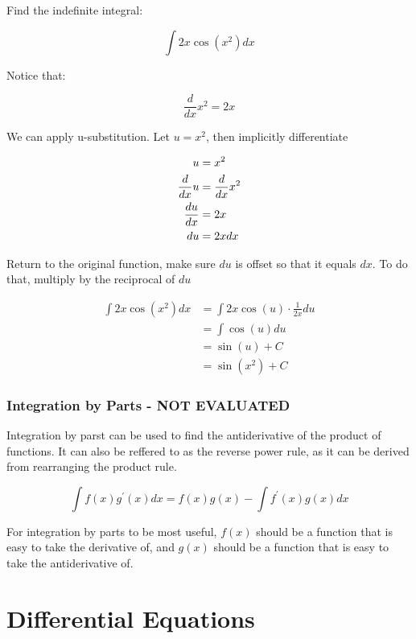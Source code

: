 \documentclass[12pt]{article}
\begin{document}
        \noindent Find the indefinite integral:

        \[
            \int 2x\cos(x^2) dx    
        \]

        \noindent Notice that:

        \[
            \frac{d}{dx} x^2 = 2x
        \]

        \noindent We can apply u-substitution. Let $u = x^2$, then implicitly differentiate

        \[
            \begin{aligned}
                u &= x^2\\
                \frac{d}{dx}u &= \frac{d}{dx}x^2\\
                \frac{du}{dx} &= 2x \\
                du &= 2x\space dx
            \end{aligned}
        \]

        \noindent Return to the original function, make sure $du$ is offset so that it 
                 equals $dx$. To do that, multiply by the reciprocal of $du$

        \[
            \begin{aligned}
                \int 2x\cos(x^2)dx &= \int 2x\cos(u)\cdot\frac{1}{2x} du\\
                &= \int \cos(u) du\\
                &= \sin(u) + C\\
                &= \sin(x^2) + C
            \end{aligned}
        \]

        \subsubsection{Integration by Parts - NOT EVALUATED}
        
        Integration by parst can be used to find the antiderivative of the product of
        functions. It can also be reffered to as the reverse power rule, as it can be derived from 
        rearranging the product rule.

        \[
            \int f(x)g^{\prime}(x)dx = f(x)g(x) - \int f^{\prime}(x)g(x)dx    
        \]

        For integration by parts to be most useful, $f(x)$ should be a function that is easy to take
        the derivative of, and $g(x)$ should be a function that is easy to take the antiderivative of.

        \section{Differential Equations}
\end{document}
